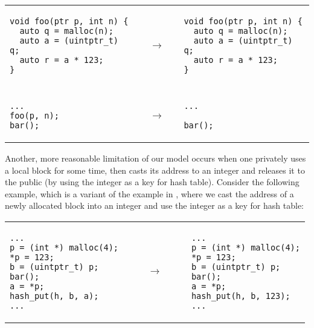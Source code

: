 \begin{center}
\small
\begin{tabular}{@{}l@{}l@{}l@{}}
\begin{minipage}{0.4\textwidth}
\begin{verbatim}
void foo(ptr p, int n) {
  auto q = malloc(n);
  auto a = (uintptr_t) q;
  auto r = a * 123;
}
\end{verbatim}
\end{minipage}
&
$\quad\rightarrow\quad$
&
\begin{minipage}{0.4\textwidth}
\begin{verbatim}
void foo(ptr p, int n) {
  auto q = malloc(n);
  auto a = (uintptr_t) q;
  auto r = a * 123;
}
\end{verbatim}
\end{minipage}
\\
\\
\begin{minipage}{0.4\textwidth}
\begin{verbatim}
...
foo(p, n);
bar();
\end{verbatim}
\end{minipage}
&
$\quad\rightarrow\quad$
&
\begin{minipage}{0.4\textwidth}
\begin{verbatim}
...

bar();
\end{verbatim}
\end{minipage}
\end{tabular}
\end{center}

Another, more reasonable limitation of our model occurs when one privately uses a local block for some time, then casts its address to an integer and releases it to the
public (\eg by using the integer as a key for hash table).  Consider the following example, which is a variant of the example in ,
where we cast the address of a newly allocated block into an integer
and use the integer as a key for hash table:

\vskip 0.2cm

\begin{center}
\small
\begin{tabular}{@{}l@{}l@{}l@{}}
\begin{minipage}{0.3\textwidth}
\begin{verbatim}
...
p = (int *) malloc(4);
*p = 123;
b = (uintptr_t) p;
bar();
a = *p;
hash_put(h, b, a);
...
\end{verbatim}
\end{minipage}
&
$\qquad\rightarrow\qquad$
&
\begin{minipage}{0.3\textwidth}
\begin{verbatim}
...
p = (int *) malloc(4);
*p = 123;
b = (uintptr_t) p;
bar();
a = *p;
hash_put(h, b, 123);
...
\end{verbatim}
\end{minipage}
\\
\end{tabular}
\end{center}

